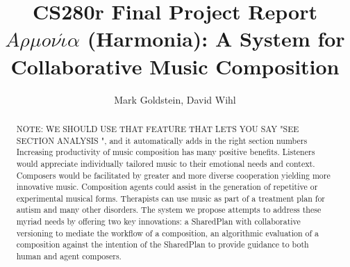 \documentclass[final,authoryear,11pt,times]{elsarticle}
\begin{document}
\begin{frontmatter}



\title{CS280r Final Project Report \\ $A \rho \mu o \nu \acute{\iota} \alpha$ (Harmonia): A System for Collaborative Music Composition}


\author{Mark Goldstein, David Wihl}
\address{\{markgoldstein,davidwihl\}@g.harvard.edu}

\begin{abstract}


NOTE: WE SHOULD USE THAT FEATURE THAT LETS YOU SAY "SEE SECTION ANALYSIS ", and it automatically adds in the right section numbers\\

Increasing productivity of music composition has many positive benefits. Listeners
would appreciate individually tailored music to their emotional needs and context.
Composers would be facilitated by greater and more diverse cooperation yielding more
innovative music. Composition agents could assist in the generation of repetitive or 
experimental musical forms. Therapists can use music as part of a treatment plan 
for autism and
many other disorders. The system we propose attempts to address these myriad needs 
by offering two key innovations: a SharedPlan with collaborative versioning to mediate the workflow of a composition, an algorithmic evaluation of a composition against the intention of the
SharedPlan to provide guidance to both human and agent composers.

\end{abstract}
\end{frontmatter}
\end{document}
